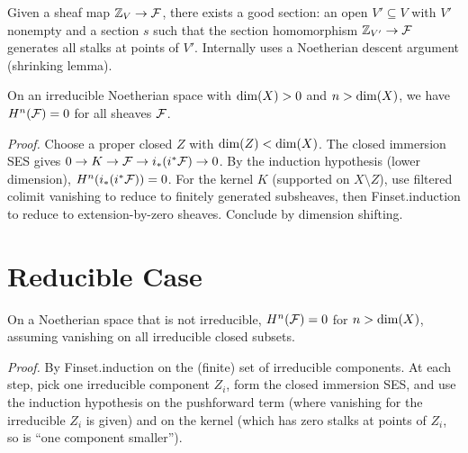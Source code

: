 \begin{lemma}\label{lem:exists_good_section}
  \leanok
  Given a sheaf map $\mathbb{Z}_V \to \mathcal{F}$, there exists a good section: an open
  $V' \subseteq V$ with $V'$ nonempty and a section $s$ such that the section
  homomorphism $\mathbb{Z}_{V'} \to \mathcal{F}$ generates all stalks at points of $V'$.
  Internally uses a Noetherian descent argument (shrinking lemma).
\end{lemma}

\begin{theorem}\label{thm:IrreduciblePosVanishing}
  \leanok
  On an irreducible Noetherian space with $\operatorname{dim}(X) > 0$ and
  $n > \operatorname{dim}(X)$, we have $H^n(\mathcal{F}) = 0$ for all sheaves $\mathcal{F}$.

  \emph{Proof.} Choose a proper closed $Z$ with $\operatorname{dim}(Z) < \operatorname{dim}(X)$.
  The closed immersion SES gives $0 \to K \to \mathcal{F} \to i_*(i^*\mathcal{F}) \to 0$.
  By the induction hypothesis (lower dimension), $H^n(i_*(i^*\mathcal{F})) = 0$.
  For the kernel $K$ (supported on $X \setminus Z$), use
  filtered colimit vanishing to reduce to finitely generated subsheaves,
  then Finset.induction to reduce to extension-by-zero sheaves.
  Conclude by dimension shifting.
\end{theorem}


\chapter{Reducible Case}\label{ch:reducible}

\begin{theorem}\label{thm:ReducibleVanishing}
  \leanok
  On a Noetherian space that is not irreducible, $H^n(\mathcal{F}) = 0$ for $n > \operatorname{dim}(X)$,
  assuming vanishing on all irreducible closed subsets.

  \emph{Proof.} By Finset.induction on the (finite) set of irreducible components.
  At each step, pick one irreducible component $Z_i$, form the closed immersion
  SES, and use the induction hypothesis on the pushforward term (where vanishing
  for the irreducible $Z_i$ is given) and on the kernel (which has zero stalks at
  points of $Z_i$, so is ``one component smaller'').
\end{theorem}


